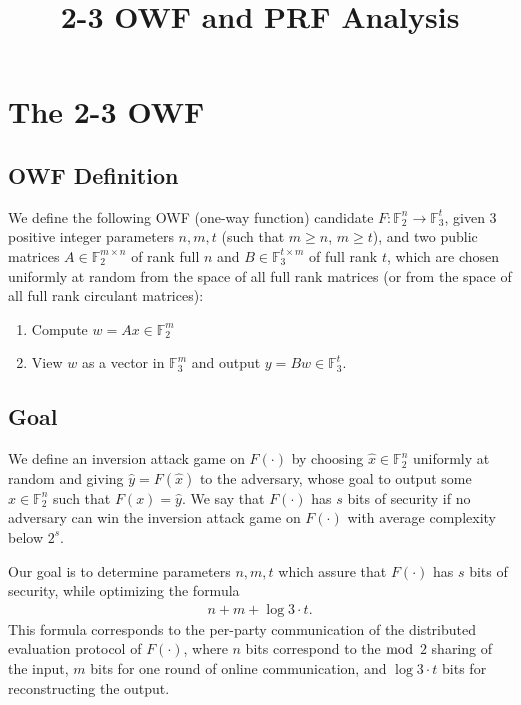 \documentclass{article}
\title{2-3 OWF and PRF Analysis}
\date{}
\begin{document}
\maketitle

\section{The 2-3 OWF}

\subsection{OWF Definition}

We define the following OWF (one-way function) candidate $F: \mathbb{F}_2^n \rightarrow \mathbb{F}_3^t$,
given 3 positive integer parameters $n,m,t$ (such that $m \geq n$, $m \geq t$), and two public matrices $A \in \mathbb{F}_2^{m \times n}$ of rank full $n$ and
$B \in \mathbb{F}_3^{t \times m}$ of full rank $t$, which are chosen uniformly at random from the space
of all full rank matrices (or from the space of all full rank circulant matrices):
\begin{enumerate}
  \item Compute $w = Ax \in \mathbb{F}_2^m$
  \item View $w$ as a vector in $\mathbb{F}_3^m$ and output $y = Bw \in \mathbb{F}_3^t$.
\end{enumerate}


\subsection{Goal}

We define an inversion attack game on $F(\cdot)$ by choosing
$\hat{x} \in \mathbb{F}_2^n$ uniformly at random and giving $\hat{y}= F(\hat{x})$ to the adversary, whose
goal to output some $x \in \mathbb{F}_2^n$ such that $F(x) = \hat{y}$.
We say that $F(\cdot)$ has $s$ bits of security if no adversary can win the inversion attack game on $F(\cdot)$ with average complexity below $2^s$.

Our goal is to determine parameters $n,m,t$ which assure that $F(\cdot)$ has $s$ bits of security,
while optimizing the formula
\begin{align}
\label{eq:opt}
n+m+ \log 3 \cdot t.
\end{align}
This formula corresponds to the per-party communication of the distributed evaluation protocol of $F(\cdot)$, where $n$ bits correspond to the $\bmod$ $2$ sharing of the input, $m$ bits for one round of online communication, and $\log 3 \cdot t$ bits for reconstructing the output.
\end{document}
